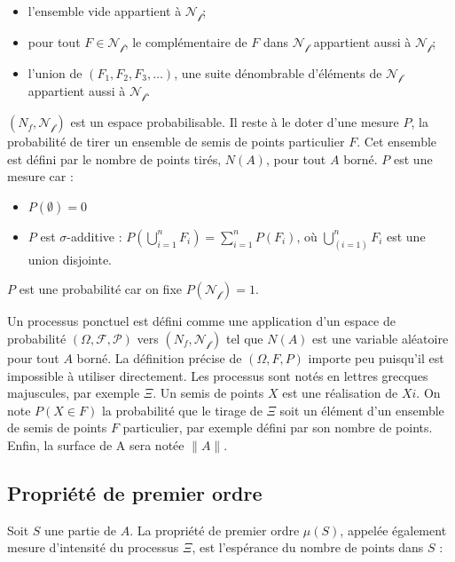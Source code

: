 \documentclass[
  11pt,
  french,
  A4paper,
  extrafontsizes,onecolumn,openright
  ]{memoir}
\theoremstyle{definition}
\theoremstyle{definition}
\theoremstyle{definition}
\theoremstyle{remark}
\begin{document}
\begin{itemize}
\item
  l'ensemble vide appartient à \(\mathcal{N_f}\);
\item
  pour tout \(F \in \mathcal{N_f}\), le complémentaire de \(F\) dans
  \(\mathcal{N_f}\) appartient aussi à \(\mathcal{N_f}\);
\item
  l'union de \((F_1, F_2, F_3,…)\), une suite dénombrable d'éléments de
  \(\mathcal{N_f}\) appartient aussi à \(\mathcal{N_f}\).
\end{itemize}

\((N_f, \mathcal{N_f})\) est un espace probabilisable. Il reste à le
doter d'une mesure \(P\), la probabilité de tirer un ensemble de semis
de points particulier \(F\). Cet ensemble est défini par le nombre de
points tirés, \(N(A)\), pour tout \(A\) borné. \(P\) est une mesure car
:

\begin{itemize}
\item
  \(P(\emptyset)=0\)
\item
  \(P\) est \(\sigma\)-additive :
  \(P(\bigcup_{i=1}^n F_i) = \sum_{i=1}^n {P(F_i)}\), où
  \(\bigcup_(i=1)^n F_i\) est une union disjointe.
\end{itemize}

\(P\) est une probabilité car on fixe \(P(\mathcal{N_f})=1\).

Un processus ponctuel est défini comme une application d'un espace de
probabilité \((\Omega, \mathcal{F}, \mathcal{P})\) vers
\((N_f,\mathcal{N_f})\) tel que \(N(A)\) est une variable aléatoire pour
tout \(A\) borné. La définition précise de \((\Omega, F, P)\) importe
peu puisqu'il est impossible à utiliser directement. Les processus sont
notés en lettres grecques majuscules, par exemple \(\Xi\). Un semis de
points \(X\) est une réalisation de \(Xi\). On note \(P(X \in F)\) la
probabilité que le tirage de \(\Xi\) soit un élément d'un ensemble de
semis de points \(F\) particulier, par exemple défini par son nombre de
points. Enfin, la surface de A sera notée \(\|A\|\).

\subsection{Propriété de premier
ordre}\label{propriete-de-premier-ordre}

Soit \(S\) une partie de \(A\). La propriété de premier ordre
\(\mu(S)\), appelée également mesure d'intensité du processus \(\Xi\),
est l'espérance du nombre de points dans \(S\) :
\end{document}

